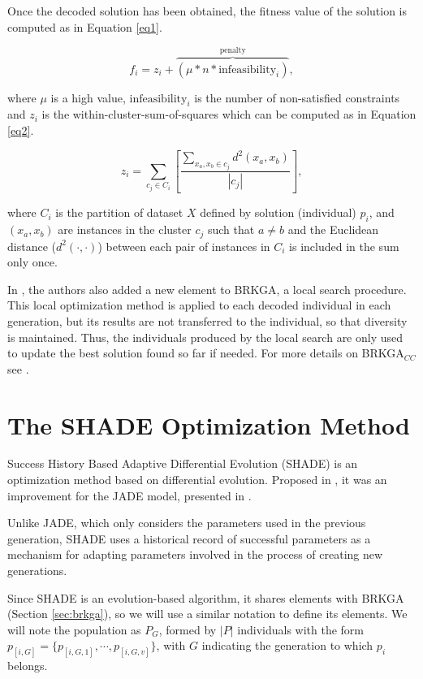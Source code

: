 \documentclass[review]{elsarticle}
\begin{document}
Once the decoded solution has been obtained, the fitness value of the solution is computed as in Equation \eqref{eq1}.

\begin{equation}
f_i = z_i + \overbrace{(\mu * n * \text{infeasibility}_i)}^\text{penalty},
\label{eq1}
\end{equation}

\noindent where $\mu$ is a high value, $\text{infeasibility}_i$ is the number of non-satisfied constraints and $z_i$ is the within-cluster-sum-of-squares which can be computed as in Equation \eqref{eq2}.

\begin{equation}
z_i = \sum_{c_j \in C_i} \left[ \frac{\sum_{x_a, x_b \in c_j} d^2(x_a,x_b)}{|c_j|}\right],
\label{eq2}
\end{equation}

\noindent where $C_i$ is the partition of dataset $X$ defined by solution (individual) $p_i$, and $(x_a, x_b)$ are instances in the cluster $c_j$ such that $a \neq b$ and the Euclidean distance ($d^2(\cdot, \cdot)$) between each pair of instances in $C_i$ is included in the sum only once.

In \cite{de2017comparison}, the authors also added a new element to BRKGA, a local search procedure. This local optimization method is applied to each decoded individual in each generation, but its results are not transferred to the individual, so that diversity is maintained. Thus, the individuals produced by the local search are only used to update the best solution found so far if needed. For more details on BRKGA$_{CC}$ see \cite{de2017comparison}.

\section{The SHADE Optimization Method} \label{sec:SHADE}

Success History Based Adaptive Differential Evolution (SHADE) is an optimization method based on differential evolution. Proposed in \cite{tanabe2013success}, it was an improvement for the JADE model, presented in \cite{zhang2009jade}.

Unlike JADE, which only considers the parameters used in the previous generation, SHADE uses a historical record of successful parameters as a mechanism for adapting parameters involved in the process of creating new generations.

Since SHADE is an evolution-based algorithm, it shares elements with BRKGA (Section \ref{sec:brkga}), so we will use a similar notation to define its elements. We will note the population as $P_G$, formed by $|P|$ individuals with the form $p_{[i,G]} = \{p_{[i,G,1]}, \cdots, p_{[i,G,v]}\}$, with $G$ indicating the generation to which $p_i$ belongs.
\end{document}
